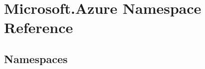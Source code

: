 \hypertarget{namespace_microsoft_1_1_azure}{}\section{Microsoft.\+Azure Namespace Reference}
\label{namespace_microsoft_1_1_azure}
\subsection*{Namespaces}
\begin{DoxyCompactItemize}
\end{DoxyCompactItemize}
